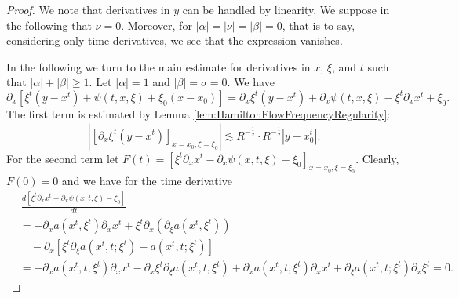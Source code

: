 \documentclass[10pt,a4paper]{amsart}
\begin{document}
\begin{proof}
We note that derivatives in $y$ can be handled by linearity. We suppose in the following that $\nu = 0$. Moreover, for $|\alpha|=|\nu|=|\beta|=0$, that is to say, considering only time derivatives, we see that the expression vanishes.

\smallskip

In the following we turn to the main estimate for derivatives in $x$, $\xi$, and $t$ such that $|\alpha|+|\beta| \geq 1$. Let $|\alpha| = 1$ and $|\beta| = \sigma = 0$. We have
\begin{equation*}
\partial_x [ \xi^t (y-x^t) + \psi(t,x,\xi) + \xi_0 (x-x_0)] = \partial_x \xi^t (y-x^t) + \partial_x \psi(t,x,\xi) - \xi^t \partial_x x^t + \xi_0.
\end{equation*}
The first term is estimated by Lemma \ref{lem:HamiltonFlowFrequencyRegularity}:
\begin{equation*}
| [ \partial_x \xi^t (y-x^t) ]_{x=x_0,\xi=\xi_0} | \lesssim R^{-\frac{1}{2}} \cdot R^{-\frac{1}{2}} |y-x_0^t|.
\end{equation*}
For the second term let $F(t) = [ \xi^t \partial_x x^t - \partial_x \psi(x,t,\xi) - \xi_0 ]_{x = x_0,\xi = \xi_0}$. Clearly, $F(0) = 0$ and we have for the time derivative
\begin{equation*}
\begin{split}
&\, \frac{d [\xi^t \partial_x x^t - \partial_x \psi(x,t,\xi) - \xi_0]}{dt} \\
 &= -  \partial_x a(x^t,\xi^t) \partial_x x^t + \xi^t \partial_x ( \partial_{\xi} a(x^t, \xi^t)) \\
&\quad - \partial_x [ \xi^t \partial_{\xi} a(x^t,t;\xi^t) - a(x^t,t;\xi^t)] \\
&= - \partial_x a(x^t,t,\xi^t) \partial_x x^t - \partial_x \xi^t \partial_{\xi} a(x^t,t,\xi^t) + \partial_x a(x^t,t,\xi^t) \partial_x x^t +  \partial_{\xi} a(x^t,t;\xi^t) \partial_x \xi^t = 0.
\end{split}
\end{equation*}

\medskip


\end{proof}
\end{document}
